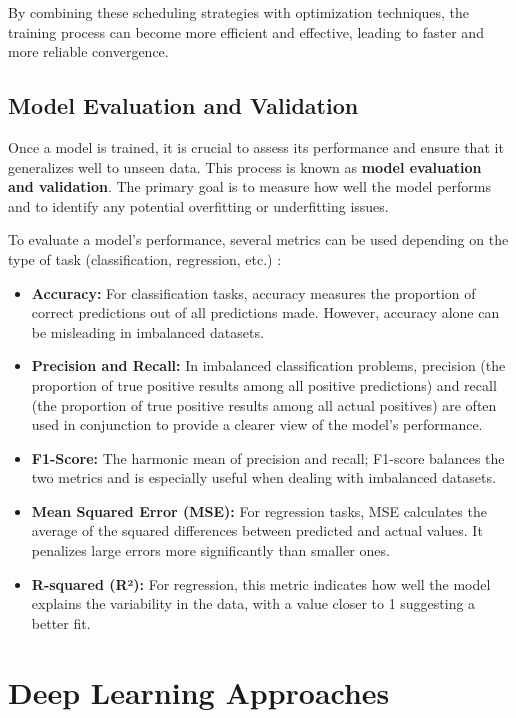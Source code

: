 By combining these scheduling strategies with optimization techniques, the training process can become more efficient and effective, leading to faster and more reliable convergence.






\subsection{Model Evaluation and Validation}

Once a model is trained, it is crucial to assess its performance and ensure that it generalizes well to unseen data. This process is known as \textbf{model evaluation and validation}. The primary goal is to measure how well the model performs and to identify any potential overfitting or underfitting issues.

To evaluate a model’s performance, several metrics can be used depending on the type of task (classification, regression, etc.) \parencite{ketkar2017deep}:
\begin{itemize}
    \item \textbf{Accuracy:} For classification tasks, accuracy measures the proportion of correct predictions out of all predictions made. However, accuracy alone can be misleading in imbalanced datasets.
    \item \textbf{Precision and Recall:} In imbalanced classification problems, precision (the proportion of true positive results among all positive predictions) and recall (the proportion of true positive results among all actual positives) are often used in conjunction to provide a clearer view of the model's performance.
    \item \textbf{F1-Score:} The harmonic mean of precision and recall; F1-score balances the two metrics and is especially useful when dealing with imbalanced datasets.
    \item \textbf{Mean Squared Error (MSE):} For regression tasks, MSE calculates the average of the squared differences between predicted and actual values. It penalizes large errors more significantly than smaller ones.
    \item \textbf{R-squared (R²):} For regression, this metric indicates how well the model explains the variability in the data, with a value closer to 1 suggesting a better fit.
\end{itemize}


\section{Deep Learning Approaches}

